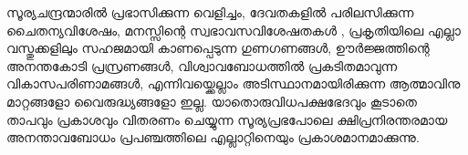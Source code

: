 സൂര്യചന്ദ്രന്മാരില്‍ പ്രഭാസിക്കുന്ന വെളിച്ചം, ദേവതകളില്‍ പരിലസിക്കുന്ന ചൈതന്യവിശേഷം, മനസ്സിന്റെ സ്വഭാവസവിശേഷതകള്‍ , പ്രകൃതിയിലെ എല്ലാ വസ്തുക്കളിലും സഹജമായി കാണപ്പെടുന്ന ഗുണഗണങ്ങള്‍, ഊര്‍ജ്ജത്തിന്റെ അനന്തകോടി പ്രസ്രണങ്ങള്‍, വിശ്വാവബോധത്തില്‍ പ്രകടിതമാവുന്ന വികാസപരിണാമങ്ങള്‍, എന്നിവയ്ക്കെല്ലാം അടിസ്ഥാനമായിരിക്കുന്ന ആത്മാവിനു മാറ്റങ്ങളോ വൈരുദ്ധ്യങ്ങളോ ഇല്ല. യാതൊരുവിധപക്ഷഭേദവും കൂടാതെ താപവും പ്രകാശവും വിതരണം ചെയ്യുന്ന സൂര്യപ്രഭപോലെ ക്ഷിപ്രനിരന്തരമായ അനന്താവബോധം പ്രപഞ്ചത്തിലെ എല്ലാറ്റിനെയും പ്രകാശമാനമാക്കുന്നു.

